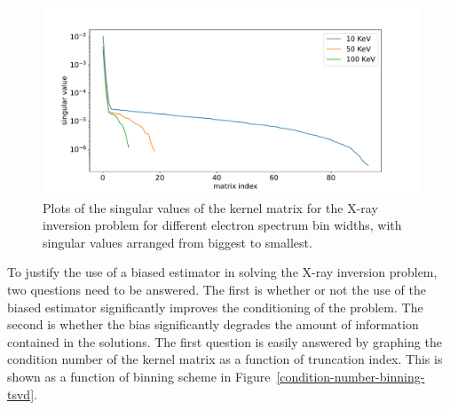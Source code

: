 \begin{figure}[p]
    \centering
    \includegraphics[width=1.0\textwidth]{figures/chapter_4/singular_value_plots/fig.pdf}
    \caption{Plots of the singular values of the kernel matrix for the X-ray inversion problem for different electron spectrum bin widths, with singular values arranged from biggest to smallest.}
    \label{singular-value-plots}
\end{figure}

To justify the use of a biased estimator in solving the X-ray inversion problem, two questions need to be answered. The first is whether or not the use of the biased estimator significantly improves the conditioning of the problem. The second is whether the bias significantly degrades the amount of information contained in the solutions. The first question is easily answered by graphing the condition number of the kernel matrix as a function of truncation index. This is shown as a function of binning scheme in Figure~\ref{condition-number-binning-tsvd}.  

